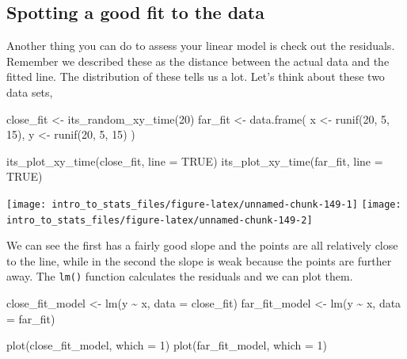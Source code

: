 \documentclass[
]{book}
\newenvironment{Shaded}{\begin{snugshade}}{\end{snugshade}}
\newcommand{\AttributeTok}[1]{\textcolor[rgb]{0.77,0.63,0.00}{#1}}
\newcommand{\ConstantTok}[1]{\textcolor[rgb]{0.00,0.00,0.00}{#1}}
\newcommand{\DecValTok}[1]{\textcolor[rgb]{0.00,0.00,0.81}{#1}}
\newcommand{\FunctionTok}[1]{\textcolor[rgb]{0.00,0.00,0.00}{#1}}
\newcommand{\NormalTok}[1]{#1}
\newcommand{\OtherTok}[1]{\textcolor[rgb]{0.56,0.35,0.01}{#1}}
\newcommand{\SpecialCharTok}[1]{\textcolor[rgb]{0.00,0.00,0.00}{#1}}
\begin{document}
\hypertarget{spotting-a-good-fit-to-the-data}{%
\subsection{Spotting a good fit to the data}\label{spotting-a-good-fit-to-the-data}}

Another thing you can do to assess your linear model is check out the residuals. Remember we described these as the distance between the actual data and the fitted line. The distribution of these tells us a lot. Let's think about these two data sets,

\begin{Shaded}
\begin{Highlighting}[]
\NormalTok{close\_fit }\OtherTok{\textless{}{-}} \FunctionTok{its\_random\_xy\_time}\NormalTok{(}\DecValTok{20}\NormalTok{)}
\NormalTok{far\_fit }\OtherTok{\textless{}{-}} \FunctionTok{data.frame}\NormalTok{(}
\NormalTok{  x }\OtherTok{\textless{}{-}} \FunctionTok{runif}\NormalTok{(}\DecValTok{20}\NormalTok{, }\DecValTok{5}\NormalTok{, }\DecValTok{15}\NormalTok{),}
\NormalTok{  y }\OtherTok{\textless{}{-}} \FunctionTok{runif}\NormalTok{(}\DecValTok{20}\NormalTok{, }\DecValTok{5}\NormalTok{, }\DecValTok{15}\NormalTok{)}
\NormalTok{)}

\FunctionTok{its\_plot\_xy\_time}\NormalTok{(close\_fit, }\AttributeTok{line =} \ConstantTok{TRUE}\NormalTok{)}
\FunctionTok{its\_plot\_xy\_time}\NormalTok{(far\_fit, }\AttributeTok{line =} \ConstantTok{TRUE}\NormalTok{)}
\end{Highlighting}
\end{Shaded}

\texttt{[image: intro\_to\_stats\_files/figure-latex/unnamed-chunk-149-1]} \texttt{[image: intro\_to\_stats\_files/figure-latex/unnamed-chunk-149-2]}

We can see the first has a fairly good slope and the points are all relatively close to the line, while in the second the slope is weak because the points are further away. The \texttt{lm()} function calculates the residuals and we can plot them.

\begin{Shaded}
\begin{Highlighting}[]
\NormalTok{close\_fit\_model }\OtherTok{\textless{}{-}} \FunctionTok{lm}\NormalTok{(y }\SpecialCharTok{\textasciitilde{}}\NormalTok{ x, }\AttributeTok{data =}\NormalTok{ close\_fit)}
\NormalTok{far\_fit\_model }\OtherTok{\textless{}{-}} \FunctionTok{lm}\NormalTok{(y }\SpecialCharTok{\textasciitilde{}}\NormalTok{ x, }\AttributeTok{data =}\NormalTok{ far\_fit)}

\FunctionTok{plot}\NormalTok{(close\_fit\_model, }\AttributeTok{which =} \DecValTok{1}\NormalTok{)}
\FunctionTok{plot}\NormalTok{(far\_fit\_model, }\AttributeTok{which =} \DecValTok{1}\NormalTok{)}
\end{Highlighting}
\end{Shaded}
\end{document}
